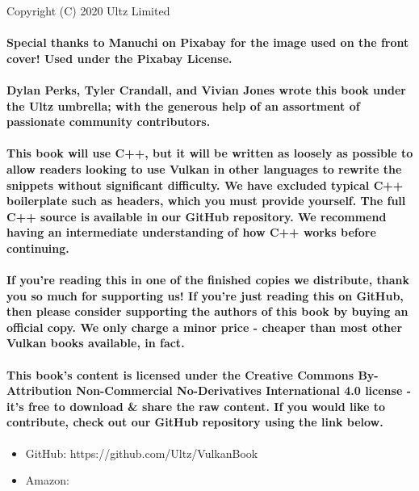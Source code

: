 Copyright (C) 2020 Ultz Limited

\paragraph{
Special thanks to Manuchi on Pixabay for the image used on the front cover! Used under the Pixabay License.
}

\paragraph{
Dylan Perks, Tyler Crandall, and Vivian Jones wrote this book under the Ultz umbrella; with the generous help of an assortment of passionate community contributors.
}

\paragraph{
This book will use C++, but it will be written as loosely as possible to allow readers looking to use Vulkan in other languages to rewrite the snippets without significant difficulty. We have excluded typical C++ boilerplate such as headers, which you must provide yourself. The full C++ source is available in our GitHub repository. We recommend having an intermediate understanding of how C++ works before continuing.
}

\paragraph{
If you're reading this in one of the finished copies we distribute, thank you so much for supporting us! If you're just reading this on GitHub, then please consider supporting the authors of this book by buying an official copy. We only charge a minor price - cheaper than most other Vulkan books available, in fact.
}

\paragraph{
This book's content is licensed under the Creative Commons By-Attribution Non-Commercial No-Derivatives International 4.0 license - it's free to download \& share the raw content. If you would like to contribute, check out our GitHub repository using the link below.
}

\begin{itemize}
\itemsep1pt\parskip0pt
\item
  GitHub: https://github.com/Ultz/VulkanBook
\item
  Amazon: 
\end{itemize}
\newpage